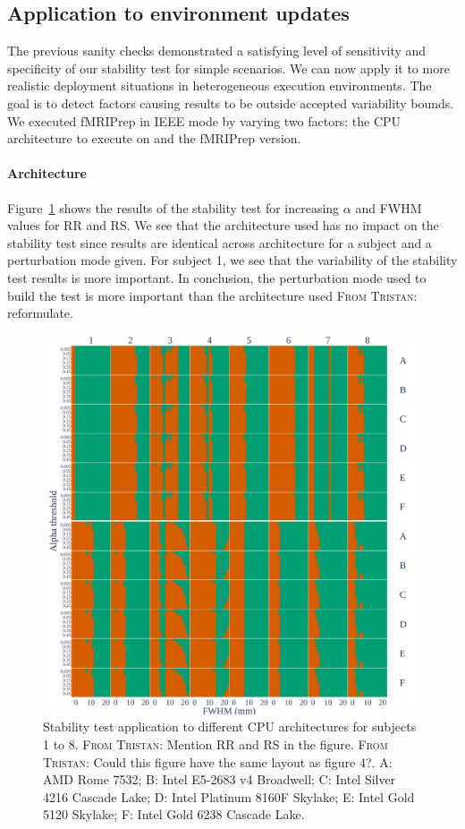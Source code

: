 \documentclass[lettersize,journal]{IEEEtran}
\newcommand{\TG}[1]{\color{blue}\textsc{From Tristan:} #1\color{black}\xspace}
\newcommand{\fmriprep}{fMRIPrep\xspace}
\begin{document}
\subsection{Application to environment updates}

The previous sanity checks demonstrated a satisfying level of sensitivity and specificity of our stability test for simple scenarios. We can now apply it to more realistic deployment situations in heterogeneous execution environments.
The goal is to detect factors causing results to be outside
accepted variability bounds. We executed \fmriprep in IEEE mode by varying
two factors: the CPU architecture to execute on and the \fmriprep version.

\paragraph*{Architecture} Figure~\ref{fig:arch_bonferroni} shows the results of the stability test for increasing $\alpha$ and FWHM values for RR and RS. We see that the architecture used has no impact on the stability test since results are identical across architecture for a subject and a perturbation mode given. For subject 1, we see that the variability of the stability test results is more important. In conclusion, the perturbation mode used to build the test is more important than the architecture used \TG{reformulate}.


\begin{figure}
    \centering
    \includegraphics[width=\linewidth]{figures/arch/arch_fwe_bonferroni.pdf}
    \caption{Stability test application to different CPU architectures for subjects 1 to 8. \TG{Mention RR and RS in the figure.} \TG{Could this figure have the same layout as figure 4?}. A: AMD Rome 7532; B: Intel E5-2683 v4 Broadwell; C: Intel Silver 4216 Cascade Lake; D: Intel Platinum 8160F Skylake; E: Intel Gold 5120 Skylake; F: Intel Gold 6238 Cascade Lake.}
    \label{fig:arch_bonferroni}
\end{figure}
\end{document}
